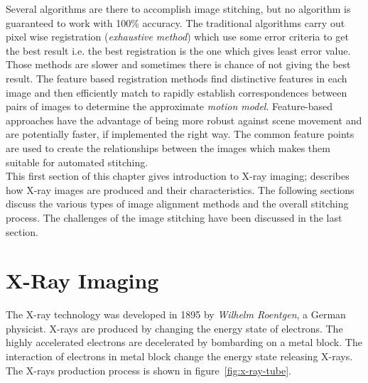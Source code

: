 \noindent Several algorithms are there to accomplish image stitching, but no algorithm is guaranteed to work with 100\% accuracy. The traditional algorithms carry out pixel wise registration (\emph{exhaustive method}) which use some error criteria to get the best result i.e. the best registration is the one which gives least error value. Those methods are slower and sometimes there is chance of not giving the best result. The feature based registration methods find distinctive features in each image and then efficiently match to rapidly establish correspondences between pairs of images to determine the approximate \emph{motion model}. Feature-based approaches have the advantage of being more robust against scene movement and are potentially faster, if implemented the right way\cite{Szeliski:06}. The common feature points are used to create the relationships between the images which makes them suitable for automated stitching.\\

\noindent This first section of this chapter gives introduction to X-ray imaging; describes how X-ray images are produced and their characteristics. The following sections discuss the various types of image alignment methods and the overall stitching process. The challenges of the image stitching have been discussed in the last section. 

\section{X-Ray Imaging}
The X-ray technology was developed in 1895 by \textit{Wilhelm Roentgen}, a German physicist. X-rays are produced by changing the energy state of electrons. The highly accelerated electrons are decelerated by bombarding on a metal block. The interaction of electrons in metal block change the energy state releasing X-rays. The X-rays production process is shown in figure~\ref{fig:x-ray-tube}.\\

